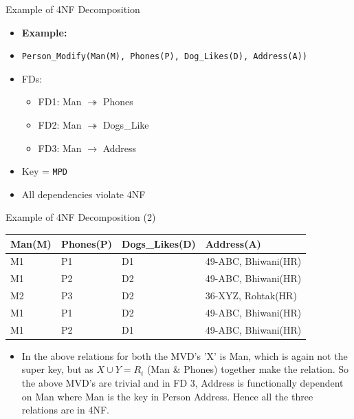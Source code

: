 \documentclass[aspectratio=169, xcolor=dvipsnames]{beamer}
\begin{document}
\begin{frame}{Example of 4NF Decomposition}
    \begin{itemize}[<+->]
        \item \textbf{Example:}
        \item \texttt{Person\_Modify(Man(M), Phones(P), Dog\_Likes(D), Address(A))}
        \item FDs:
        \begin{itemize}
            \item[$\triangleright$] FD1: Man $\twoheadrightarrow$ Phones
            \item[$\triangleright$] FD2: Man $\twoheadrightarrow$ Dogs\_Like
            \item[$\triangleright$] FD3: Man $\rightarrow$ Address
        \end{itemize}
        \item Key = \texttt{MPD}
        \item All dependencies violate 4NF
    \end{itemize}
\end{frame}

\begin{frame}{Example of 4NF Decomposition (2)}
    \begin{table}
    \centering
    \begin{tabular}{llll}
    \toprule
    \textbf{Man(M)} & \textbf{Phones(P)} & \textbf{Dogs\_Likes(D)} & \textbf{Address(A)} \\
    \midrule
    M1 & P1 & D1 & 49-ABC, Bhiwani(HR) \\
    M1 & P2 & D2 & 49-ABC, Bhiwani(HR) \\
    M2 & P3 & D2 & 36-XYZ, Rohtak(HR) \\
    M1 & P1 & D2 & 49-ABC, Bhiwani(HR) \\
    M1 & P2 & D1 & 49-ABC, Bhiwani(HR) \\
    \bottomrule
    \end{tabular}
    \end{table}
    \begin{itemize}
        \item In the above relations for both the MVD's 'X' is Man, which is again not the super key, but as $X \cup Y = R_i$ (Man \& Phones) together make the relation. So the above MVD's are trivial and in FD 3, Address is functionally dependent on Man where Man is the key in Person Address. Hence all the three relations are in 4NF.
    \end{itemize}
\end{frame}
\end{document}

